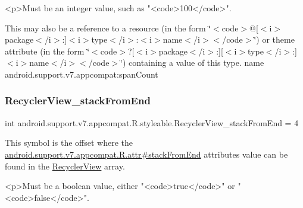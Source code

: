 \begin{DoxyVerb}      <p>Must be an integer value, such as "<code>100</code>".
\end{DoxyVerb}
 

This may also be a reference to a resource (in the form \char`\"{}$<$code$>$@\mbox{[}$<$i$>$package$<$/i$>$\+:\mbox{]}$<$i$>$type$<$/i$>$\+:$<$i$>$name$<$/i$>$$<$/code$>$\char`\"{}) or theme attribute (in the form \char`\"{}$<$code$>$?\mbox{[}$<$i$>$package$<$/i$>$\+:\mbox{]}\mbox{[}$<$i$>$type$<$/i$>$\+:\mbox{]}$<$i$>$name$<$/i$>$$<$/code$>$\char`\"{}) containing a value of this type.  name android.\+support.\+v7.\+appcompat\+:span\+Count \mbox{\label{classandroid_1_1support_1_1v7_1_1appcompat_1_1R_1_1styleable_af2042a32a5c4358617f057338c016568}} 
\subsubsection{\texorpdfstring{Recycler\+View\+\_\+stack\+From\+End}{RecyclerView\_stackFromEnd}}
{\footnotesize\ttfamily int android.\+support.\+v7.\+appcompat.\+R.\+styleable.\+Recycler\+View\+\_\+stack\+From\+End = 4\hspace{0.3cm}{\ttfamily [static]}}

This symbol is the offset where the \hyperlink{classandroid_1_1support_1_1v7_1_1appcompat_1_1R_1_1attr_a289a58377dd0ca0cc2c1a23520dc61fc}{android.\+support.\+v7.\+appcompat.\+R.\+attr\#stack\+From\+End} attribute\textquotesingle{}s value can be found in the \hyperlink{classandroid_1_1support_1_1v7_1_1appcompat_1_1R_1_1styleable_ae3744efe286beea8d85d9fa344fa70df}{Recycler\+View} array.

\begin{DoxyVerb}      <p>Must be a boolean value, either "<code>true</code>" or "<code>false</code>".
\end{DoxyVerb}
 

